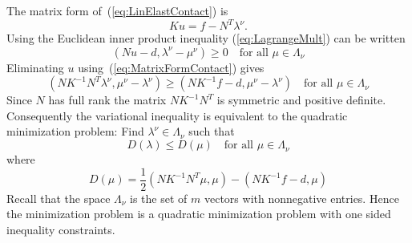 \documentclass[12pt,a4paper]{article}
\numberwithin{equation}{section}
\numberwithin{table}{section}
\numberwithin{figure}{section}
\newcommand{\half}{\ensuremath{\frac{1}{2}}}
\newcommand{\Kinv}{\ensuremath{K^{-1}}}
\newcommand{\qforall}{\quad\text{for all }}
\begin{document}
The matrix form of~(\ref{eq:LinElastContact}) is
\begin{equation}
  \label{eq:MatrixFormContact}
  K u = f - N^T \lambda^\nu.
\end{equation}
Using the Euclidean inner product inequality (\ref{eq:LagrangeMult}) can be written
\begin{equation}
  \label{eq:LagrangeMultContactInner}
  (N u - d, \lambda^\nu-\mu^\nu) \ge 0
  \qforall \mu \in \Lambda_\nu
\end{equation}
Eliminating $u$ using~(\ref{eq:MatrixFormContact}) gives
\begin{equation}
  \label{eq:21}
  (N \Kinv N^T \lambda^\nu, \mu^\nu-\lambda^\nu)
  \ge (N \Kinv f - d, \mu^\nu-\lambda^\nu) \qforall \mu\in\Lambda_\nu
\end{equation}
Since $N$ has full rank the matrix $N\Kinv N^T$ is symmetric and positive definite.
Consequently the variational inequality is equivalent to the quadratic minimization
problem: Find $\lambda^\nu\in \Lambda_\nu$ such that
\begin{equation}
  \label{eq:27}
  D(\lambda) \le D(\mu)\qforall \mu \in \Lambda_\nu
\end{equation}
where
\begin{equation}
  \label{eq:28}
  D(\mu) = \half(N \Kinv N^T \mu, \mu) - (N \Kinv f -d, \mu) 
\end{equation}
Recall that the space $\Lambda_\nu$ is the set of $m$ vectors with nonnegative entries.
Hence the minimization problem is a quadratic minimization problem with one sided
inequality constraints.




\end{document}
